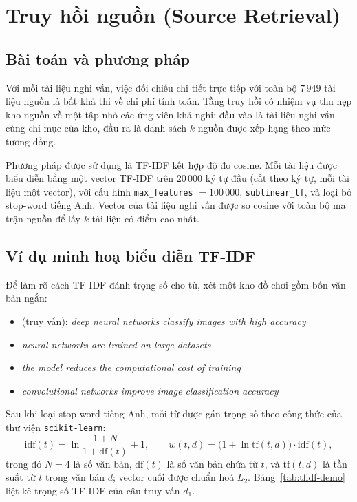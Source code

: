 
\section{Truy hồi nguồn (Source Retrieval)}

\subsection{Bài toán và phương pháp}

Với mỗi tài liệu nghi vấn, việc đối chiếu chi tiết trực tiếp với toàn bộ $7\,949$
tài liệu nguồn là bất khả thi về chi phí tính toán. Tầng truy hồi có nhiệm vụ thu hẹp
kho nguồn về một tập nhỏ các ứng viên khả nghi: đầu vào là tài liệu nghi vấn cùng chỉ mục
của kho, đầu ra là danh sách $k$ nguồn được xếp hạng theo mức tương đồng.

Phương pháp được sử dụng là TF-IDF kết hợp độ đo cosine. Mỗi tài liệu được biểu diễn bằng
một vector TF-IDF trên $20\,000$ ký tự đầu (cắt theo ký tự, mỗi tài liệu một vector), với
cấu hình \texttt{max\_features} $=100\,000$, \texttt{sublinear\_tf}, và loại bỏ stop-word
tiếng Anh. Vector của tài liệu nghi vấn được so cosine với toàn bộ ma trận nguồn để lấy
$k$ tài liệu có điểm cao nhất.

\subsection{Ví dụ minh hoạ biểu diễn TF-IDF}

Để làm rõ cách TF-IDF đánh trọng số cho từ, xét một kho đồ chơi gồm bốn văn bản ngắn:

\begin{itemize}
  \item[$d_1$] (truy vấn): \emph{deep neural networks classify images with high accuracy}
  \item[$d_2$:] \emph{neural networks are trained on large datasets}
  \item[$d_3$:] \emph{the model reduces the computational cost of training}
  \item[$d_4$:] \emph{convolutional networks improve image classification accuracy}
\end{itemize}

Sau khi loại stop-word tiếng Anh, mỗi từ được gán trọng số theo công thức của thư viện
\texttt{scikit-learn}:
\[
\mathrm{idf}(t) = \ln\frac{1+N}{1+\mathrm{df}(t)} + 1,
\qquad
w(t,d) = \big(1 + \ln \mathrm{tf}(t,d)\big)\cdot \mathrm{idf}(t),
\]
trong đó $N=4$ là số văn bản, $\mathrm{df}(t)$ là số văn bản chứa từ $t$, và $\mathrm{tf}(t,d)$ là
tần suất từ $t$ trong văn bản $d$; vector cuối được chuẩn hoá $L_2$. Bảng~\ref{tab:tfidf-demo}
liệt kê trọng số TF-IDF của câu truy vấn $d_1$.

